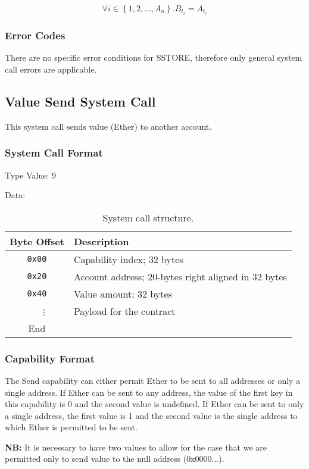 \documentclass[english,a4paper]{article}
\let\oldparagraph\subsubsection
\renewcommand{\subsubsection}[1]{\oldparagraph{#1}\mbox{}}
\begin{document}
$$ \forall i \in \left\{1,2,\dots ,A_n\right\}. B_{t_i} = A_{t_i} $$

\subsubsection{Error Codes}
There are no specific error conditions for SSTORE, therefore only general system
call errors are applicable.

\subsection{Value Send System Call}
This system call sends value (Ether) to another account.

\subsubsection{System Call Format}
Type Value: 9

Data:

\begin{table}[H]
  \caption{System call structure.}
  \centering{}%
  \begin{tabularx}{\textwidth}{c|X}
    \hline
    Byte Offset & Description\\
    \hline
    \hline
    \texttt{0x00} & Capability index; 32 bytes \\
    \texttt{0x20} & Account address; 20-bytes right aligned in 32 bytes \\
    \texttt{0x40} & Value amount; 32 bytes \\
    ~~~$\vdots$ & Payload for the contract \\
    \hline
    End &  \\
    \hline
  \end{tabularx}
\end{table}

\subsubsection{Capability Format}

The Send capability can either permit Ether to be sent to all addresses or only
a single address. If Ether can be sent to any address, the value of the first
key in this capability is 0 and the second value is undefined. If Ether can be
sent to only a single address, the first value is 1 and the second value is the
single address to which Ether is permitted to be sent.

\textbf{NB:} It is necessary to have two values to allow for the case that we
are permitted only to send value to the null address (0x0000...).
\end{document}
